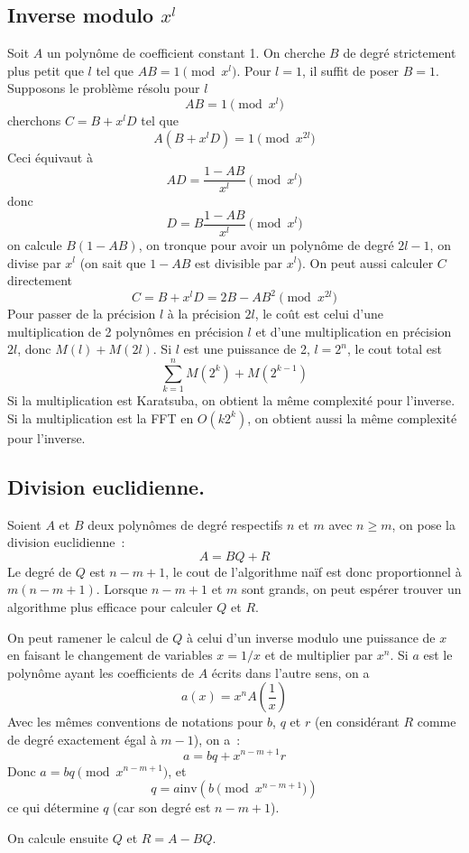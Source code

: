 \documentclass[a4paper,11pt]{book}
\begin{document}
\begin{giacjshere}
\subsection{Inverse modulo $x^l$}
Soit $A$ un polyn\^ome de coefficient constant 1. On cherche $B$
de degr\'e strictement plus petit que $l$
tel que $AB=1 \pmod{x^l}$. Pour $l=1$, il suffit de poser $B=1$.
Supposons le probl\`eme r\'esolu pour $l$
$$AB=1 \pmod{x^l}$$
cherchons $C=B+x^lD$ tel que
$$ A(B+x^lD)= 1 \pmod{x^{2l}} $$
Ceci \'equivaut \`a
$$ AD=\frac{1-AB}{x^l} \pmod{x^l}$$
donc
$$ D=B \frac{1-AB}{x^l} \pmod{x^l} $$
on calcule $B(1-AB)$, on tronque pour avoir un polyn\^ome de degr\'e $2l-1$,
on divise par $x^l$ (on sait que $1-AB$ est divisible par $x^l$).
On peut aussi calculer $C$ directement
$$ C=B+x^lD= 2B-AB^2 \pmod{x^{2l}}$$
Pour passer de la pr\'ecision $l$ \`a la pr\'ecision $2l$, le co\^ut
est celui d'une multiplication de 2 polyn\^omes en pr\'ecision $l$ et
d'une multiplication en pr\'ecision $2l$, donc $M(l)+M(2l)$.
Si $l$ est une puissance de 2, $l=2^n$, le cout total est
$$ \sum_{k=1}^n M(2^k)+M(2^{k-1})$$
Si la multiplication est Karatsuba, on obtient la m\^eme complexit\'e
pour l'inverse. Si la multiplication est la FFT en $O(k2^k)$, on obtient
aussi la m\^eme complexit\'e pour l'inverse.

\subsection{Division euclidienne.}
Soient $A$ et $B$ deux polyn\^omes de degr\'e respectifs $n$ et $m$
avec $n \geq m$, on pose la division euclidienne~:
$$ A=BQ+R $$
Le degr\'e de $Q$ est $n-m+1$, le cout de l'algorithme na\"if
est donc proportionnel \`a $m(n-m+1)$. Lorsque $n-m+1$ et $m$ sont grands,
on peut esp\'erer trouver un algorithme plus efficace pour calculer
$Q$ et $R$.

On peut ramener le calcul de $Q$ \`a celui d'un inverse 
modulo une puissance de $x$
en faisant le changement de variables 
$x=1/x$ et de multiplier par $x^n$. Si $a$ est le polyn\^ome
ayant les coefficients de $A$ \'ecrits dans l'autre sens, on a
$$ a(x) = x^n A(\frac{1}{x}) $$
Avec les m\^emes conventions de notations pour $b$, $q$ et $r$ (en 
consid\'erant $R$ comme de degr\'e exactement \'egal \`a $m-1$), on a~:
$$ a=bq+x^{n-m+1} r$$
Donc $ a=bq \pmod{x^{n-m+1}}$, et
$$ q=a \mbox{inv}(b \pmod{x^{n-m+1}}) $$
ce qui d\'etermine $q$ (car son degr\'e est $n-m+1$).

On calcule ensuite $Q$ et $R=A-BQ$.


\end{giacjshere}
\end{document}
